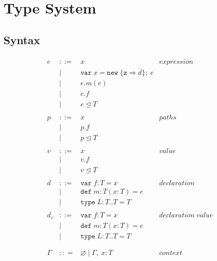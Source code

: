 \documentclass{llncs}
\begin{document}
\section{Type System}
	\label{s:type_sys}


\subsection{Syntax}


\begin{figure}[h]
\[
\begin{array}{lll}
\begin{array}{lllr}
e & ::= & x & expression \\
& | & \texttt{var} \; x = \texttt{new} \; \{\texttt{z} \Rightarrow \overline{d}\}; \; e&\\
& | & e.m(e) &\\
& | & e.f &\\
& | & e \unlhd T&\\
&&\\
p & ::= & x & paths \\
& | & p.f &\\
& | & p \unlhd T &\\
&&\\
v & ::= & x & value \\
& | & v.f &\\
& | & v \unlhd T &\\
&&\\
d & ::= & \texttt{var} \; f : T = x & declaration \\
  & |   & \texttt{def} \; m : T(x:T) = e &\\
  & |   & \texttt{type} \; L : T .. T = T &\\
&&\\
d_v & ::= & \texttt{var} \; f : T = x & declaration \; value \\
  & |   & \texttt{def} \; m : T(x:T) = e &\\
  & |   & \texttt{type} \; L : T .. T = T &\\
&&\\
&&\\
\Gamma & :: = & \varnothing \; | \; \Gamma, \; x : T & context \\

\end{array}
\end{array}\]
\end{figure}
\end{document}
